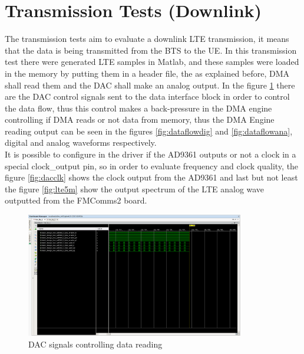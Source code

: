 \vfill
\clearpage

\section{Transmission Tests (Downlink)}
\label{result:dac}

 The transmission tests aim to evaluate a downlink LTE transmission, it means
that the data is being transmitted from the BTS to the UE. In this transmission
test there were generated LTE samples in Matlab, and these samples were loaded
in the memory by putting them in a header file, the as explained before, DMA
shall read them and the DAC shall make an analog output. In the figure
\ref{fig:dacsignals} there are the DAC control signals sent to the data
interface block in order to control the data flow, thus this control makes a
back-pressure in the DMA engine controlling if DMA reads or not data from
memory, thus the DMA Engine reading output can be seen in the figures
\ref{fig:dataflowdig} and \ref{fig:dataflowana}, digital and analog waveforms
respectively.\\

 It is possible to configure in the driver if the AD9361 outputs or not a clock
in a special clock\_output pin, so in order to evaluate frequency and clock
quality, the figure \ref{fig:dacclk} shows the clock output from the AD9361 and
last but not least the figure \ref{fig:lte5m} show the output spectrum of the
LTE analog wave outputted from the FMComms2 board.

\begin{figure}[htbp]
    \centering
    \includegraphics[width=0.85\textwidth]{./figures/dac_signals}
    \caption{ DAC signals controlling data reading
    \label{fig:dacsignals}}
\end{figure}

